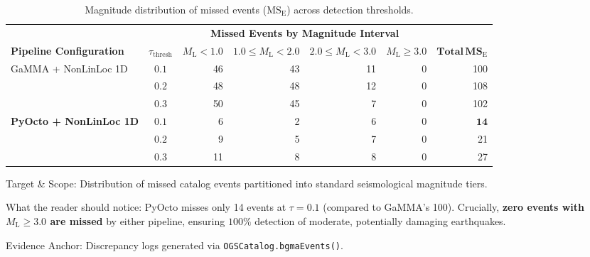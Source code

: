 \begin{table}[htbp]
  \centering
  \small
  \caption{Magnitude distribution of missed events ($\mathrm{MS}_{\mathrm{E}}$) across detection thresholds.}
  \label{tab:missed_events_magnitude}
  \begin{threeparttable}
    \begin{tabularx}{\linewidth}{l c r r r r r}
      \toprule
      & & \multicolumn{4}{c}{\textbf{Missed Events by Magnitude Interval}} & \\
      \cmidrule(lr){3-6}
      \textbf{Pipeline Configuration} & $\tau_{\mathrm{thresh}}$ & $M_{\mathrm{L}} < 1.0$ & $1.0 \le M_{\mathrm{L}} < 2.0$ & $2.0 \le M_{\mathrm{L}} < 3.0$ & $M_{\mathrm{L}} \ge 3.0$ & $\mathbf{Total\,MS}_{\mathrm{E}}$ \\
      \midrule
      \multirow{3}{*}{GaMMA + NonLinLoc 1D} & $0.1$ & \num{46} & \num{43} & \num{11} & \num{0} & \num{100} \\
      & $0.2$ & \num{48} & \num{48} & \num{12} & \num{0} & \num{108} \\
      & $0.3$ & \num{50} & \num{45} & \num{7} & \num{0} & \num{102} \\
      \midrule
      \multirow{3}{*}{\textbf{PyOcto + NonLinLoc 1D}} & $0.1$ & \num{6} & \num{2} & \num{6} & \num{0} & $\mathbf{14}$ \\
      & $0.2$ & \num{9} & \num{5} & \num{7} & \num{0} & \num{21} \\
      & $0.3$ & \num{11} & \num{8} & \num{8} & \num{0} & \num{27} \\
      \bottomrule
    \end{tabularx}
    \begin{tablenotes}[flushleft]
      \footnotesize
      \item Target \& Scope: Distribution of missed catalog events partitioned into standard seismological magnitude tiers.
      \item What the reader should notice: PyOcto misses only 14 events at $\tau=0.1$ (compared to GaMMA's 100). Crucially, \textbf{zero events with $M_{\mathrm{L}} \ge 3.0$ are missed} by either pipeline, ensuring $100\%$ detection of moderate, potentially damaging earthquakes.
      \item Evidence Anchor: Discrepancy logs generated via \texttt{OGSCatalog.bgmaEvents()}.
    \end{tablenotes}
  \end{threeparttable}
\end{table}

